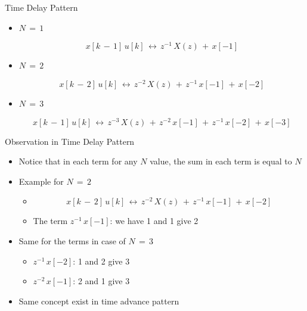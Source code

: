 \documentclass{beamer}
\begin{document}
\begin{frame}[t]{Time Delay Pattern}

\begin{itemize}

\item $N \, = \, 1$

\begin{equation*}
x[k \, - \, 1] \, u[k] \,\leftrightarrow \,  z^{-1} \, X(z) \, + \, x[-1]
\end{equation*}

\item $N \, = \, 2$

\begin{equation*}
x[k \, - \, 2] \, u[k] \,\leftrightarrow \,  z^{-2} \, X(z)\, + \, z^{-1} \, x[-1] \, + \, x[-2]
\end{equation*}


\item $N \, = \, 3$

\begin{equation*}
x[k \, - \, 1] \, u[k] \,\leftrightarrow \,  z^{-3} \, X(z)\, + \, z^{-2} \, x[-1] \, + \, z^{-1}\, x[-2] \, + \, x[-3]
\end{equation*}

\end{itemize}

\end{frame}

\begin{frame}[t]{Observation in Time Delay Pattern}

\begin{itemize}

\item Notice that in each term for any $N$ value, the sum in each term is equal to $N$

\item Example for $N \, = \, 2$

	\begin{itemize}
	\item \begin{equation*}
x[k \, - \, 2] \, u[k] \,\leftrightarrow \,  z^{-2} \, X(z)\, + \, z^{-1} \, x[-1] \, + \, x[-2]
\end{equation*}

	\item The term $z^{-1} \, x[-1] $: we have 1 and 1 give 2
	\end{itemize}

\item Same for the terms in case of $N \, = \, 3$

	\begin{itemize}
	\item $z^{-1} \, x[-2] $: 1 and 2 give 3
	
	\item $z^{-2} \, x[-1] $: 2 and 1 give 3
	\end{itemize}

\item Same concept exist in time advance pattern

\end{itemize}

\end{frame}
\end{document}
